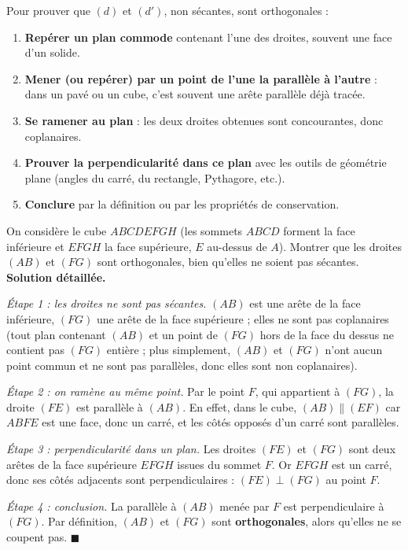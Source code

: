 \documentclass[11pt]{article}
\newcounter{popsec}
\newcounter{popsub}
\newcommand{\courssub}[1]{%
  \stepcounter{popsub}%
  \par\vspace{9pt}\noindent{\popxbold\fontsize{11.5}{13}\selectfont\color{popink}{\color{poporange}\thepopsec.\thepopsub}\hspace{6pt}#1}\par\nopagebreak\vspace{4pt}
}
\begin{document}
\courssub{Méthode de démonstration}

\begin{methode}
Pour prouver que $(d)$ et $(d')$, non sécantes, sont orthogonales :
\begin{enumerate}
\item \textbf{Repérer un plan commode} contenant l'une des droites, souvent une face d'un solide.
\item \textbf{Mener (ou repérer) par un point de l'une la parallèle à l'autre} : dans un pavé ou un cube, c'est souvent une arête parallèle déjà tracée.
\item \textbf{Se ramener au plan} : les deux droites obtenues sont concourantes, donc coplanaires.
\item \textbf{Prouver la perpendicularité dans ce plan} avec les outils de géométrie plane (angles du carré, du rectangle, Pythagore, etc.).
\item \textbf{Conclure} par la définition ou par les propriétés de conservation.
\end{enumerate}
\end{methode}

\begin{exoresolu}
On considère le cube $ABCDEFGH$ (les sommets $ABCD$ forment la face inférieure et $EFGH$ la face supérieure, $E$ au-dessus de $A$). Montrer que les droites $(AB)$ et $(FG)$ sont orthogonales, bien qu'elles ne soient pas sécantes.
\tcblower
\textbf{Solution détaillée.}

\emph{Étape 1 : les droites ne sont pas sécantes.} $(AB)$ est une arête de la face inférieure, $(FG)$ une arête de la face supérieure ; elles ne sont pas coplanaires (tout plan contenant $(AB)$ et un point de $(FG)$ hors de la face du dessus ne contient pas $(FG)$ entière ; plus simplement, $(AB)$ et $(FG)$ n'ont aucun point commun et ne sont pas parallèles, donc elles sont non coplanaires).

\emph{Étape 2 : on ramène au même point.} Par le point $F$, qui appartient à $(FG)$, la droite $(FE)$ est parallèle à $(AB)$. En effet, dans le cube, $(AB)\parallel(EF)$ car $ABFE$ est une face, donc un carré, et les côtés opposés d'un carré sont parallèles.

\emph{Étape 3 : perpendicularité dans un plan.} Les droites $(FE)$ et $(FG)$ sont deux arêtes de la face supérieure $EFGH$ issues du sommet $F$. Or $EFGH$ est un carré, donc ses côtés adjacents sont perpendiculaires : $(FE)\perp(FG)$ au point $F$.

\emph{Étape 4 : conclusion.} La parallèle à $(AB)$ menée par $F$ est perpendiculaire à $(FG)$. Par définition, $(AB)$ et $(FG)$ sont \textbf{orthogonales}, alors qu'elles ne se coupent pas. $\blacksquare$
\end{exoresolu}
\end{document}
